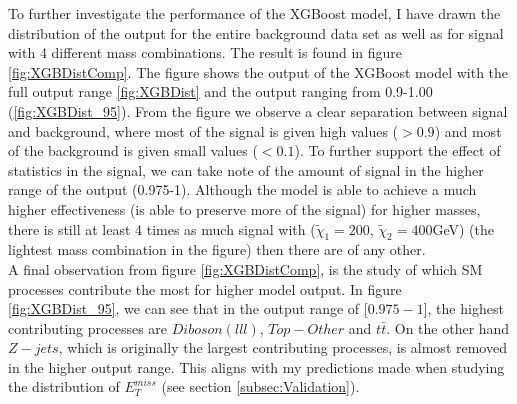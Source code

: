 To further investigate the performance of the XGBoost model, I have drawn the distribution of the output for the 
entire background data set as well as for signal with 4 different mass combinations. The result is found in figure 
\ref{fig:XGBDistComp}. The figure shows the output of the XGBoost model with the full output range \ref{fig:XGBDist}
and the output ranging from 0.9-1.00 (\ref{fig:XGBDist_95}). From the figure we observe a clear separation between 
signal and background, where most of the signal is given high values ($>0.9$) and most of the background is given small
values ($<0.1$). To further support the effect of statistics in the signal, we can take note of the 
amount of signal in the higher range of the output (0.975-1). Although the model is able to achieve a much higher 
effectiveness (is able to preserve more of the signal) for higher masses, there is still at least 4 times as much 
signal with ($\tilde{\chi}_1=200$, $\tilde{\chi}_2=400$GeV) (the lightest mass combination in the figure) then there 
are of any other.
\\
A final observation from figure \ref{fig:XGBDistComp}, is the study of which \ac{SM} processes contribute the most 
for higher model output. In figure \ref{fig:XGBDist_95}, we can see that in the output range of [$0.975-1$], the highest 
contributing processes are $Diboson(lll)$, $Top-Other$ and $t\bar{t}$. On the other hand $Z-jets$, which is originally the 
largest contributing processes, is almost removed in the higher output range. This aligns with my predictions made when studying the 
distribution of $E_T^{miss}$ (see section \ref{subsec:Validation}).
